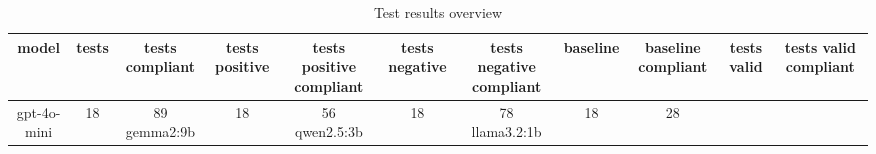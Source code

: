
  \begin{table}[h!]
  \centering
  \begin{tabular}{|c|c|c|c|c|c|c|c|c|c|c|}
  \hline
  model & tests & tests compliant & tests positive & tests positive compliant & tests negative & tests negative compliant & baseline & baseline compliant & tests valid & tests valid compliant \\
  \hline
  gpt-4o-mini & 18 & 89%
\hline
gemma2:9b & 18 & 56%
\hline
qwen2.5:3b & 18 & 78%
\hline
llama3.2:1b & 18 & 28%
  \end{tabular}
  \caption{Test results overview}
  
  \end{table}
  